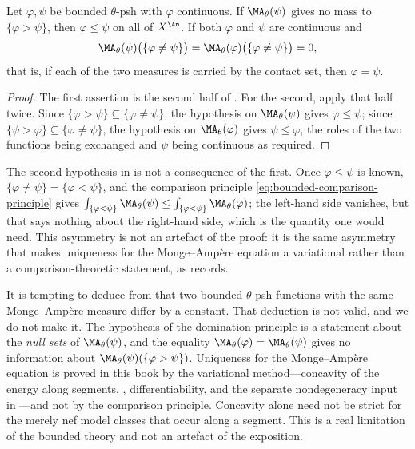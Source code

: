 \begin{corollary}
\label{cor:ch25-domination-uniqueness}
Let $\varphi,\psi$ be bounded $\theta$-psh with $\varphi$ continuous.
If $\MA_\theta(\psi)$ gives no mass to $\{\varphi>\psi\}$, then
$\varphi\leq\psi$ on all of $X^{\An}$.  If both $\varphi$ and
$\psi$ are continuous and
\[
 \MA_\theta(\psi)\bigl(\{\varphi\neq\psi\}\bigr)
 =\MA_\theta(\varphi)\bigl(\{\varphi\neq\psi\}\bigr)=0 ,
\]
that is, if each of the two measures is carried by the contact set, then
$\varphi=\psi$.
\end{corollary}

\begin{proof}
The first assertion is the second half of
.  For the second, apply that half
twice.  Since $\{\varphi>\psi\}\subseteq\{\varphi\neq\psi\}$, the
hypothesis on $\MA_\theta(\psi)$ gives $\varphi\leq\psi$; since
$\{\psi>\varphi\}\subseteq\{\varphi\neq\psi\}$, the hypothesis on
$\MA_\theta(\varphi)$ gives $\psi\leq\varphi$, the roles of the two
functions being exchanged and $\psi$ being continuous as required.
\end{proof}

\begin{remark}
\label{rem:ch25-both-carriers}
The second hypothesis in
 is not a consequence of the first.
Once $\varphi\leq\psi$ is known, $\{\varphi\neq\psi\}=\{\varphi<\psi\}$,
and the comparison principle \eqref{eq:bounded-comparison-principle} gives
$\int_{\{\varphi<\psi\}}\MA_\theta(\psi)\leq
\int_{\{\varphi<\psi\}}\MA_\theta(\varphi)$; the left-hand side vanishes,
but that says nothing about the right-hand side, which is the quantity one
would need.  This asymmetry is not an artefact of the proof: it is the same
asymmetry that makes uniqueness for the Monge--Amp\`ere equation a
variational rather than a comparison-theoretic statement, as
 records.
\end{remark}

\begin{remark}
\label{rem:ch25-no-uniqueness}
It is tempting to deduce from
 that two bounded $\theta$-psh
functions with the same Monge--Amp\`ere measure differ by a constant.  That
deduction is not valid, and we do not make it.  The hypothesis of the
domination principle is a statement about the \emph{null sets} of
$\MA_\theta(\psi)$, and the equality
$\MA_\theta(\varphi)=\MA_\theta(\psi)$ gives no information about
$\MA_\theta(\psi)(\{\varphi>\psi\})$.  Uniqueness for the
Monge--Amp\`ere equation is proved in this book by the variational
method---concavity of the energy along segments,
, differentiability, and the separate
nondegeneracy input in ---and not by the
comparison principle.  Concavity alone need not be strict for the merely
nef model classes that occur along a segment.
This is a real limitation of the bounded theory and not an artefact of the
exposition.
\end{remark}

